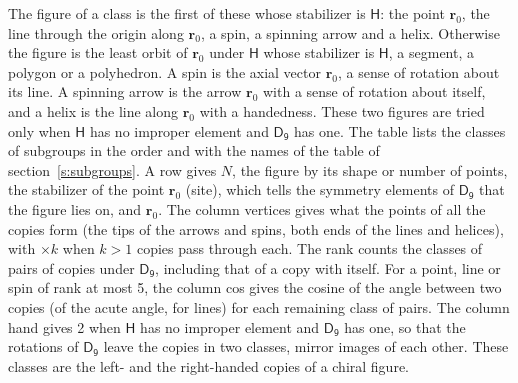 \documentclass[10pt,a4paper]{article}
\numberwithin{equation}{section}
\newcommand{\grp}[1]{\mathsf{#1}}
\newcommand{\pointr}{\mathbf{r}}
\begin{document}
\leavevmode\label{n:head.figure}The figure of a class is the first of these whose stabilizer is $\grp{H}$: the point $\pointr_0$, the line through the origin along $\pointr_0$, a spin, a spinning arrow and a helix. Otherwise the figure is the least orbit of $\pointr_0$ under $\grp{H}$ whose stabilizer is $\grp{H}$, a segment, a polygon or a polyhedron. A spin is the axial vector $\pointr_0$, a sense of rotation about its line. A spinning arrow is the arrow $\pointr_0$ with a sense of rotation about itself, and a helix is the line along $\pointr_0$ with a handedness. These two figures are tried only when $\grp{H}$ has no improper element and $\grp{D_{9}}$ has one. The table lists the classes of subgroups in the order and with the names of the table of section~\ref{s:subgroups}. \label{n:head.site}A row gives $N$, the figure by its shape or number of points, the stabilizer of the point $\pointr_0$ (site), which tells the symmetry elements of $\grp{D_{9}}$ that the figure lies on, and $\pointr_0$. \label{n:head.vertices}The column vertices gives what the points of all the copies form (the tips of the arrows and spins, both ends of the lines and helices), with ${\times}k$ when $k > 1$ copies pass through each. \label{n:head.rank}The rank counts the classes of pairs of copies under $\grp{D_{9}}$, including that of a copy with itself. \label{n:head.cos}For a point, line or spin of rank at most 5, the column cos gives the cosine of the angle between two copies (of the acute angle, for lines) for each remaining class of pairs. \label{n:head.hand}The column hand gives 2 when $\grp{H}$ has no improper element and $\grp{D_{9}}$ has one, so that the rotations of $\grp{D_{9}}$ leave the copies in two classes, mirror images of each other. These classes are the left- and the right-handed copies of a chiral figure.
\end{document}
